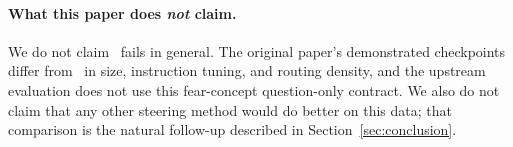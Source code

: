 \paragraph{What this paper does \emph{not} claim.}
We do not claim \steermoe~fails in general. The original paper's demonstrated
checkpoints differ from \mixtral~in size, instruction tuning, and routing
density, and the upstream evaluation does not use this fear-concept
question-only contract. We also do not claim that any other steering method
would do better on this data; that comparison is the natural follow-up
described in Section~\ref{sec:conclusion}.
